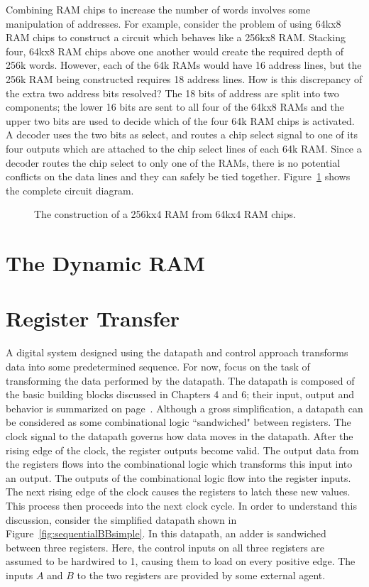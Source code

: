 Combining RAM chips to increase the number of words involves some manipulation
of addresses.  For example, consider the problem of using 64kx8 RAM chips to 
construct a circuit which behaves like a 256kx8 RAM.  Stacking four, 64kx8 RAM
chips above one another would create the required depth of 256k words.  However,
each of the 64k RAMs would have 16 address lines, but the 256k RAM being 
constructed requires 18 address lines.  How is this discrepancy of the extra 
two address bits resolved?  The 18 bits of address are split into two 
components; the lower 16 bits are sent to all four of the 64kx8 RAMs 
and the upper two bits are used to decide which of the four 64k RAM chips 
is activated.  A decoder uses
the two bits as select, and routes a chip select signal to one of its four outputs
which are attached to the chip select lines of each 64k RAM.  Since a decoder
routes the chip select to only one of the RAMs, there is no potential 
conflicts on the data lines and they can safely be tied together. 
Figure~\ref{fig:sequentialBBdeep} shows the complete circuit diagram.

\begin{figure}[ht]

\caption{The construction of a 256kx4 RAM from 64kx4 RAM chips.}
\label{fig:sequentialBBdeep}

\end{figure}

\section{The Dynamic RAM}
\pagebreak

\section{Register Transfer}
A digital system designed using the datapath and control approach 
transforms data into some predetermined sequence.  For now, focus 
on the task of transforming the data performed by the datapath.  
The datapath is composed of the basic building blocks discussed in 
Chapters 4 and 6; their input, output and behavior is summarized on 
page~\pageref{page:boxlist}.  Although a gross simplification, a 
datapath can be considered as some combinational logic ``sandwiched" 
between registers.  The clock signal to the datapath governs how 
data moves in the datapath. After the rising edge of the clock, the 
register outputs become valid. The output data from the registers 
flows into the combinational logic which transforms this input into 
an output.  The outputs of the combinational logic flow into the 
register inputs.  The next rising edge of the clock causes the 
registers to latch these new values.  This process then proceeds 
into the next clock cycle.  In order to understand this discussion, 
consider the simplified datapath shown in Figure~\ref{fig:sequentialBBsimple}.  
In this datapath, an adder is sandwiched between three registers.  
Here, the control inputs on all three registers are assumed to be 
hardwired to 1, causing them to load on every positive edge.  The 
inputs $A$ and $B$ to the two registers are provided by some 
external agent.
  

